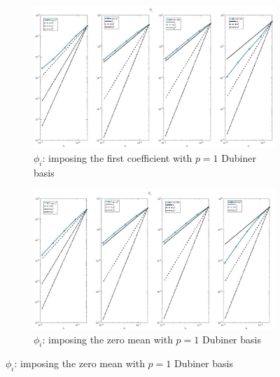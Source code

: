 \documentclass[a4paper,11pt]{article}
\begin{document}
\begin{figure}[H]
\caption{Comparison of the intracellular potential ($\phi_i$)}
\label{phii-unique}
\begin{subfigure}{\textwidth}
\begin{center}
\includegraphics[width = \textwidth]{./D1_Phii_1.jpg}
\caption{$\phi_i$: imposing the first coefficient with $p=1$ Dubiner basis}
\end{center}
\end{subfigure}
\begin{subfigure}{\textwidth}	
\begin{center}
\includegraphics[width =\textwidth]{./D1_Phii_2.jpg}
\caption{$\phi_i$: imposing the zero mean with $p=1$ Dubiner basis}
\end{center}
\end{subfigure}
\end{figure}
\newpage
\end{document}
